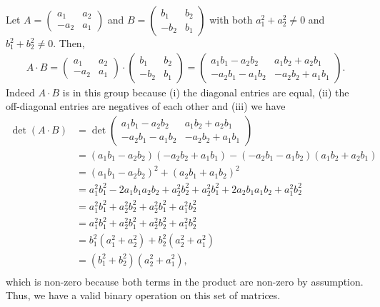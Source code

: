 \documentclass[12pt]{article}
\numberwithin{theorem}{section}
\numberwithin{equation}{section}
\numberwithin{remark}{section}
\numberwithin{definition}{section}
\numberwithin{theorem}{section}
\numberwithin{lemma}{section}
\numberwithin{example}{section}
\begin{document}
Let $A=\begin{pmatrix}a_1 & a_2 \\ -a_2 & a_1 \end{pmatrix}$ and $B=\begin{pmatrix}b_1 & b_2 \\ -b_2 & b_1 \end{pmatrix}$ with both $a_1^2+a_2^2\neq 0$ and $b_1^2+b_2^2\neq 0$. Then,
\begin{align*}
	A\cdot B = \begin{pmatrix}a_1 & a_2 \\ -a_2 & a_1 \end{pmatrix} \cdot \begin{pmatrix}b_1 & b_2 \\ -b_2 & b_1 \end{pmatrix} = \begin{pmatrix}a_1b_1-a_2b_2 & a_1b_2+a_2b_1 \\ -a_2b_1-a_1b_2 & -a_2b_2+a_1b_1 \end{pmatrix}.
\end{align*}
Indeed $A\cdot B$ is in this group because (i) the diagonal entries are equal, (ii) the off-diagonal entries are negatives of each other and (iii) we have
\begin{align*}
	\det\left(A\cdot B\right) & = \det{\begin{pmatrix}a_1b_1-a_2b_2 & a_1b_2+a_2b_1 \\ -a_2b_1-a_1b_2 & -a_2b_2+a_1b_1 \end{pmatrix}} \\
	& = (a_1b_1-a_2b_2)(-a_2b_2+a_1b_1)-(-a_2b_1-a_1b_2)(a_1b_2+a_2b_1)\\
	& = (a_1b_1-a_2b_2)^2+(a_2b_1+a_1b_2)^2\\
	& = a_1^2b_1^2-2a_1b_1a_2b_2+a_2^2b_2^2+a_2^2b_1^2+2a_2b_1a_1b_2+a_1^2b_2^2\\
	& = a_1^2b_1^2+a_2^2b_2^2+a_2^2b_1^2+a_1^2b_2^2\\
	& = a_1^2b_1^2+a_2^2b_1^2+a_2^2b_2^2+a_1^2b_2^2\\
	& = b_1^2(a_1^2+a_2^2)+b_2^2(a_2^2+a_1^2)\\
	& = (b_1^2+b_2^2)(a_2^2+a_1^2),\\
\end{align*}
which is non-zero because both terms in the product are non-zero by assumption. Thus, we have a valid binary operation on this set of matrices. 
\end{document}
